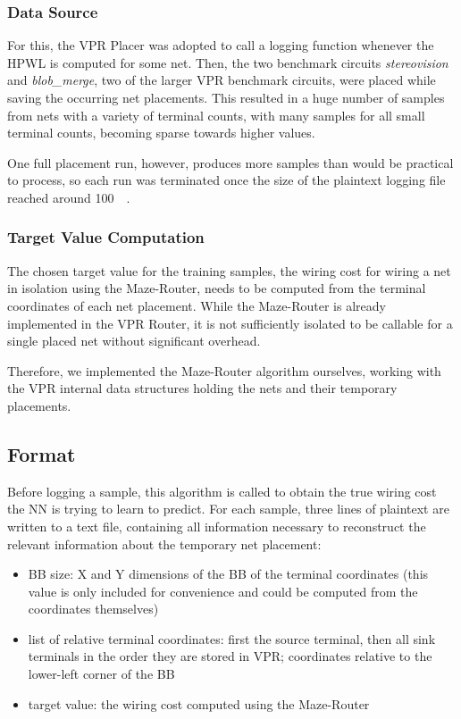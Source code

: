 \subsubsection{Data Source}

For this, the \gls{VPR} Placer was adopted to call a logging function whenever the \gls{HPWL} is computed for some net. Then, the two benchmark circuits \textit{stereovision} and \textit{blob\_merge}, two of the larger \gls{VPR} benchmark circuits, were placed while saving the occurring net placements. This resulted in a huge number of samples from nets with a variety of terminal counts, with many samples for all small terminal counts, becoming sparse towards higher values.

One full placement run, however, produces more samples than would be practical to process, so each run was terminated once the size of the plaintext logging file reached around \SI{100}{\mega\byte}.

\subsubsection{Target Value Computation}

The chosen target value for the training samples, the wiring cost for wiring a net in isolation using the Maze-Router, needs to be computed from the terminal coordinates of each net placement. While the Maze-Router is already implemented in the \gls{VPR} Router, it is not sufficiently isolated to be callable for a single placed net without significant overhead.

Therefore, we implemented the Maze-Router algorithm ourselves, working with the \gls{VPR} internal data structures holding the nets and their temporary placements.

\subsection{Format}

Before logging a sample, this algorithm is called to obtain the true wiring cost the \gls{NN} is trying to learn to predict. For each sample, three lines of plaintext are written to a text file, containing all information necessary to reconstruct the relevant information about the temporary net placement:

\begin{itemize}
	\item \gls{BB} size: X and Y dimensions of the \gls{BB} of the terminal coordinates (this value is only included for convenience and could be computed from the coordinates themselves)
	\item list of relative terminal coordinates: first the source terminal, then all sink terminals in the order they are stored in \gls{VPR}; coordinates relative to the lower-left corner of the \gls{BB}
	\item target value: the wiring cost computed using the Maze-Router
\end{itemize}

